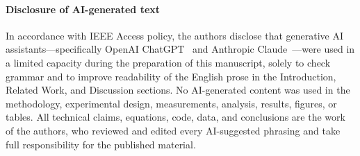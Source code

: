 \documentclass[journal]{IEEEtran}
\begin{document}
\paragraph*{Disclosure of AI-generated text}
In accordance with IEEE Access policy, the authors disclose that
generative AI assistants---specifically OpenAI ChatGPT~\cite{openai_chatgpt}
and Anthropic Claude~\cite{anthropic_claude}---were used in a limited
capacity during the preparation of this manuscript, solely to check
grammar and to improve readability of the English prose in the
Introduction, Related Work, and Discussion sections.  No
AI-generated content was used in the methodology, experimental
design, measurements, analysis, results, figures, or tables.  All
technical claims, equations, code, data, and conclusions are the
work of the authors, who reviewed and edited every AI-suggested
phrasing and take full responsibility for the published material.
\end{document}
